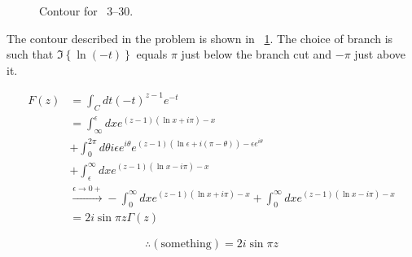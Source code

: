 \item

\begin{figure}[ht]
	\centering
	\caption{Contour for ~3--30.}%
	\label{fig:problem3-30}
\end{figure}

The contour described in the problem is shown in ~\ref{fig:problem3-30}.
The choice of branch is such that $\Im\left\{ \ln(-t) \right\}$ equals $\pi$ just below the branch cut
and $-\pi$ just above it.

\begin{align*}
    F(z)
    &= \int_C dt {(-t)}^{z - 1} e^{-t} \\
	&= \int_\infty^\epsilon dx e^{(z - 1) (\ln x + i\pi) - x} \\
    &+ \int_0^{2\pi} d\theta i\epsilon e^{i\theta} e^{(z - 1) (\ln\epsilon + i(\pi - \theta)) - \epsilon e^{i\theta}} \\
    &+ \int_\epsilon^\infty dx e^{(z - 1) (\ln x - i\pi) - x} \\
    &\xrightarrow{\epsilon \rightarrow 0+}
       - \int_0^\infty dx e^{(z - 1) (\ln x + i\pi) - x}
       + \int_0^\infty dx e^{(z - 1) (\ln x - i\pi) - x} \\
    &= 2i \sin \pi z \Gamma(z)
\end{align*}

\[
	\therefore (\text{something}) = 2i \sin \pi z
\]
